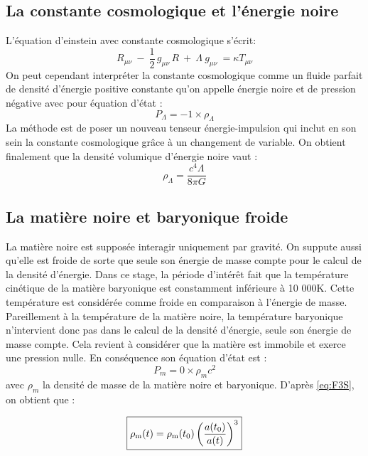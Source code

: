 \documentclass[10pt, a4paper]{report}
\numberwithin{equation}{subsection}
\begin{document}
\subsection{La constante cosmologique et l'énergie noire}
L'équation d'einstein avec constante cosmologique s'écrit:
\begin{equation} \label{eq:EFEL}
\boxed{R_{\mu \nu} \ - \ \frac{1}{2} \, g_{\mu \nu} \, R  \ + \ \Lambda \ g_{\mu \nu} \ =  \kappa T_{\mu \nu}}
\end{equation}
On peut cependant interpréter la constante cosmologique comme un fluide parfait de densité d'énergie positive constante qu'on appelle énergie noire et de pression négative avec pour équation d'état :
\begin{equation} \label{eq:EEL}
\boxed{P_\Lambda=-1 \times \rho_\Lambda}
\end{equation}
La méthode est de poser un nouveau tenseur énergie-impulsion qui inclut en son sein la constante cosmologique grâce à un changement de variable. On obtient finalement que la densité volumique d'énergie noire vaut :
\begin{equation} \label{eq:DEL}
\boxed{\rho_{\Lambda}  =  \frac{c^4 \Lambda}{8\pi G}}
\end{equation}

\subsection{La matière noire et baryonique froide}
La matière noire est supposée interagir uniquement par gravité. On suppute aussi qu'elle est froide de sorte que seule son énergie de masse compte pour le calcul de la densité d'énergie. 
Dans ce stage, la période d'intérêt fait que la température cinétique de la matière baryonique est constamment inférieure à 10 000K. Cette température est considérée comme froide en comparaison à l'énergie de masse. Pareillement à la température de la matière noire, la température baryonique n'intervient donc pas dans le calcul de la densité d'énergie, seule son énergie de masse compte. Cela revient à considérer que la matière est immobile et exerce une pression nulle.
En conséquence son équation d'état est :
\begin{equation} \label{eq:EEM}
\boxed{P_m=0 \times \rho_m c^2}
\end{equation}
avec $\rho_m$ la densité de masse de la matière noire et baryonique.
D'après \ref{eq:F3S}, on obtient que :

\begin{equation} \label{eq:DEM}
\boxed{\rho_{\rm m}(t) = \rho_{\rm m}(t_0) \left(\frac{a(t_0)}{a(t)}\right)^3}
\end{equation}
\end{document}
